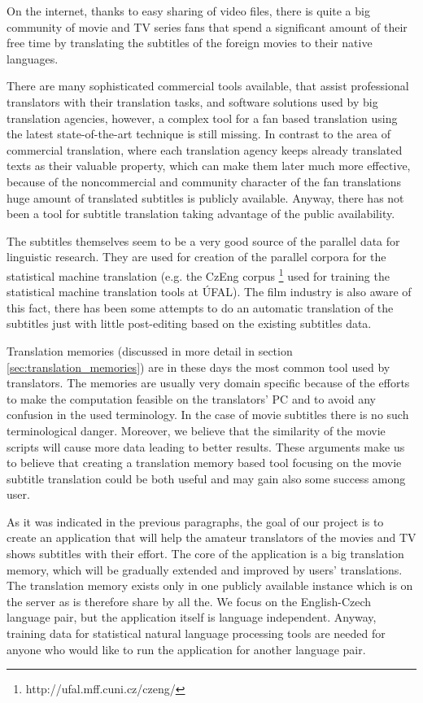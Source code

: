 On the internet, thanks to easy sharing of video files, there is quite a big community of movie and TV series fans that spend a significant amount of their free time by translating the subtitles of the foreign movies to their native languages. 

There are many sophisticated commercial tools available, that assist professional translators with their translation tasks, and software solutions used by big translation agencies, however, a complex tool for a fan based translation using the latest state-of-the-art technique is still missing. In contrast to the area of commercial translation, where each translation agency keeps already translated texts as their valuable property, which can make them later much more effective, because of the noncommercial and community character of the fan translations huge amount of translated subtitles is publicly available. Anyway, there has not been a tool for subtitle translation taking advantage of the public availability.

The subtitles themselves seem to be a very good source of the parallel data for linguistic research. They are used for creation of the parallel corpora for the statistical machine translation (e.g. the CzEng corpus \footnote{http://ufal.mff.cuni.cz/czeng/} used for training the statistical machine translation tools at ÚFAL). The film industry is also aware of this fact, there has been some attempts to do an automatic translation of the subtitles just with little post-editing based on the existing subtitles data.

Translation memories (discussed in more detail in section \ref{sec:translation_memories}) are in these days the most common tool used by translators. The memories are usually very domain specific because of the efforts to make the computation feasible on the translators' PC and to avoid any confusion in the used terminology. In the case of movie subtitles there is no such terminological danger. Moreover, we believe that the similarity of the movie scripts will cause more data leading to better results. These arguments make us to believe that creating a translation memory based tool focusing on the movie subtitle translation could be both useful and may gain also some success among user.

As it was indicated in the previous paragraphs, the goal of our project is to create an application that will help the amateur translators of the movies and TV shows subtitles with their effort. The core of the application is a big translation memory, which will be gradually extended and improved by users' translations. The translation memory exists only in one publicly available instance which is on the server as is therefore share by all the. We focus on the English-Czech language pair, but the application itself is language independent. Anyway, training data for statistical natural language processing tools are needed for anyone who would like to run the application for another language pair.

